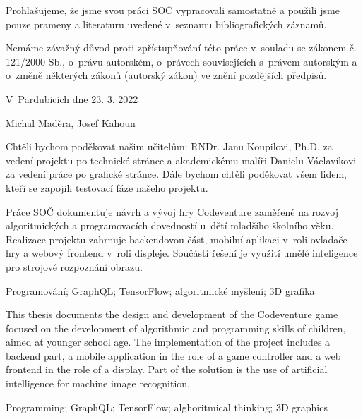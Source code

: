 
\noindent Prohlašujeme, že jsme svou práci SOČ vypracovali samostatně a použili jsme pouze prameny a literaturu uvedené v~seznamu bibliografických záznamů.

\noindent Nemáme závažný důvod proti zpřístupňování této práce v~souladu se zákonem č. 121/2000 Sb., o~právu autorském, o~právech souvisejících s~právem autorským a o~změně některých zákonů (autorský zákon) ve znění pozdějších předpisů. 

\vspace{24 pt}

\noindent V~Pardubicích dne 23. 3. 2022 \dotfill{} 

\hspace{6cm} Michal Maděra, Josef Kahoun

\cleardoublepage

\vspace*{0.8\textheight}

\noindent
Chtěli bychom poděkovat našim učitelům: RNDr. Janu Koupilovi, Ph.D. za vedení projektu po technické stránce a akademickému malíři Danielu Václavíkovi za vedení práce po grafické stránce. Dále bychom chtěli poděkovat všem lidem, kteří se zapojili testovací fáze našeho projektu.

\cleardoublepage


\noindent Práce SOČ dokumentuje návrh a vývoj hry Codeventure zaměřené na rozvoj algoritmických a programovacích dovedností u~dětí mladšího školního věku. Realizace projektu zahrnuje backendovou část, mobilní aplikaci v~roli ovladače hry a webový frontend v~roli displeje. Součástí řešení je využití umělé inteligence pro strojové rozpoznání obrazu.

\vspace{18pt}


\noindent Programování; GraphQL; TensorFlow; algoritmické myšlení; 3D grafika

\vspace{18pt}


\noindent This thesis documents the design and development of the Codeventure game focused on the development of algorithmic and programming skills of children, aimed at younger school age. The implementation of the project includes a backend part, a mobile application in the role of a game controller and a web frontend in the role of a display. Part of the solution is the use of artificial intelligence for machine image recognition.

\vspace{18pt}


\noindent Programming; GraphQL; TensorFlow; alghoritmical thinking; 3D graphics

\cleardoublepage

\tableofcontents